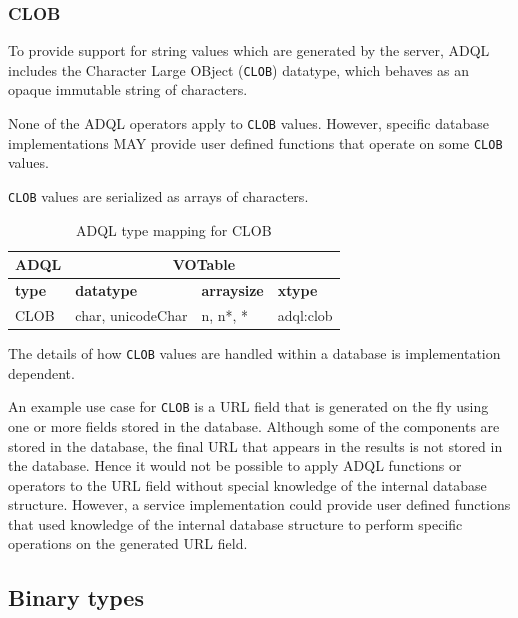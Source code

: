 \documentclass[11pt,a4paper]{ivoa}
\begin{document}
\subsubsection{CLOB}
\label{sec:types.character.clob}

To provide support for string values which are generated by the server,
ADQL includes the Character Large OBject (\verb:CLOB:) datatype,
which behaves as an opaque immutable string of characters.

None of the ADQL operators apply to \verb:CLOB: values.
However, specific database implementations MAY provide user
defined functions that operate on some \verb:CLOB: values.

\verb:CLOB: values are serialized as arrays of characters.

\begin{table}[th]\footnotesize
    \begin{tabular}
        {|p{}|p{}|p{}|p{}|}
        
        \hline
        \multicolumn{1}{|c|}{\textbf{ADQL}} &
        \multicolumn{3}{|c|}{\textbf{VOTable}}
        \tabularnewline
        
        \hline
        \textbf{type} &
        \textbf{datatype} &
        \textbf{arraysize} &
        \textbf{xtype}
        \tabularnewline

        \hline
        CLOB &
        char, unicodeChar &
        n, n*, * &
        adql:clob
        \tabularnewline
        \hline
    \end{tabular}
    \caption{ADQL type mapping for CLOB}
    \label{table:types.character.clob}
\end{table}

The details of how \verb:CLOB: values are handled within a
database is implementation dependent.

An example use case for \verb:CLOB: is a URL field that is generated on the fly
using one or more fields stored in the database.
Although some of the components are stored in the database, the final URL
that appears in the results is not stored in the database.
Hence it would not be possible to apply ADQL functions or operators to the
URL field without special knowledge of the internal database structure.
However, a service implementation could provide user defined functions
that used knowledge of the internal database structure to perform
specific operations on the generated URL field.

\subsection{Binary types}
\label{sec:types.binary}
\end{document}
